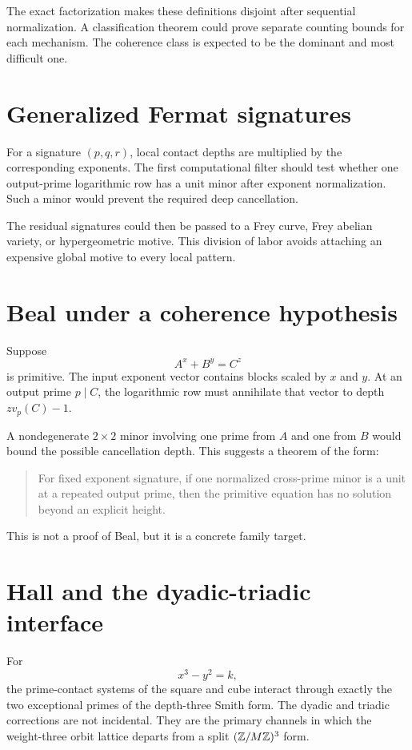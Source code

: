 The exact factorization makes these definitions disjoint after sequential normalization. A classification theorem could prove separate counting bounds for each mechanism. The coherence class is expected to be the dominant and most difficult one.

\section{Generalized Fermat signatures}
For a signature $(p,q,r)$, local contact depths are multiplied by the corresponding exponents. The first computational filter should test whether one output-prime logarithmic row has a unit minor after exponent normalization. Such a minor would prevent the required deep cancellation.

The residual signatures could then be passed to a Frey curve, Frey abelian variety, or hypergeometric motive. This division of labor avoids attaching an expensive global motive to every local pattern.

\section{Beal under a coherence hypothesis}
Suppose
\[
 A^x+B^y=C^z
\]
is primitive. The input exponent vector contains blocks scaled by $x$ and $y$. At an output prime $p\mid C$, the logarithmic row must annihilate that vector to depth $zv_p(C)-1$.

A nondegenerate $2\times2$ minor involving one prime from $A$ and one from $B$ would bound the possible cancellation depth. This suggests a theorem of the form:

\begin{quote}
For fixed exponent signature, if one normalized cross-prime minor is a unit at a repeated output prime, then the primitive equation has no solution beyond an explicit height.
\end{quote}

This is not a proof of Beal, but it is a concrete family target.

\section{Hall and the dyadic-triadic interface}
For
\[
 x^3-y^2=k,
\]
the prime-contact systems of the square and cube interact through exactly the two exceptional primes of the depth-three Smith form. The dyadic and triadic corrections are not incidental. They are the primary channels in which the weight-three orbit lattice departs from a split $(\mathbb Z/M\mathbb Z)^3$ form.

